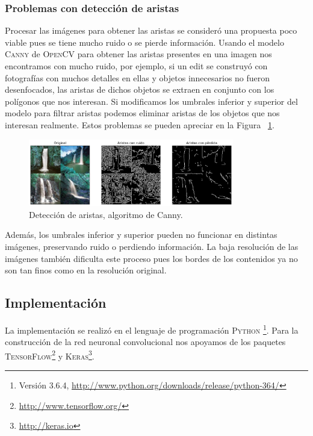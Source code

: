 \documentclass[spanish,11pt,letterpaper]{article}
\begin{document}
\subsubsection{Problemas con detección de aristas}

Procesar las imágenes para obtener las aristas se consideró una propuesta poco
viable pues se tiene mucho ruido o se pierde información. Usando el modelo
\textsc{Canny} de \textsc{OpenCV} para obtener las aristas presentes en una imagen
nos encontramos con mucho ruido, por ejemplo, si un edit se construyó con fotografías
con muchos detalles en ellas y objetos innecesarios no fueron desenfocados, las
aristas de dichos objetos se extraen en conjunto con los polígonos que nos
interesan. Si modificamos los umbrales inferior y superior del modelo para filtrar
aristas podemos eliminar aristas de los objetos que nos interesan realmente. Estos
problemas se pueden apreciar en la Figura ~\ref{fig:canny}.

\begin{figure}[h]
\centering
\includegraphics[width=0.8\textwidth]{edges}
\caption{Detección de aristas, algoritmo de Canny.}
\label{fig:canny}
\end{figure}

Además, los umbrales inferior y superior pueden no funcionar en distintas imágenes,
preservando ruido o perdiendo información. La baja resolución de las imágenes
también dificulta este proceso pues los bordes de los contenidos ya no son tan
finos como en la resolución original.

\subsection{Implementación}

La implementación se realizó en el lenguaje de programación \textsc{Python}%
\footnote{Versión 3.6.4, \url{http://www.python.org/downloads/release/python-364/}}.
Para la construcción de la red neuronal convolucional nos apoyamos de los
paquetes \textsc{TensorFlow}\footnote{\url{http://www.tensorflow.org/}} y
\textsc{Keras}\footnote{\url{http://keras.io}}.
\end{document}
